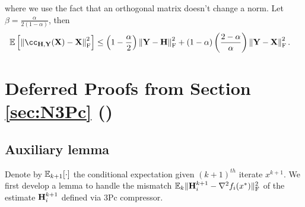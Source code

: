 \documentclass[11pt]{article}
\begin{document}
	where we use the fact that an orthogonal matrix doesn't change a norm. Let $\beta=\frac{\alpha}{2(1-\alpha)}$, then
	\begin{align}
		\ExpBr{\norm{\cc_{\mH,\mY}(\mX) - \mX}^2_{\rm F}} &\leq \left(1-\frac{\alpha}{2}\right)\norm{\mY-\mH}^2_{\rm F} + (1-\alpha)\left(\frac{2-\alpha}{\alpha}\right)\norm{\mY-\mX}^2_{\rm F}.
	\end{align}
	
	
	
	
	
	\section{Deferred Proofs from Section \ref{sec:N3Pc} ()}
	
	\subsection{Auxiliary lemma}
	
	Denote by $\mathbb{E}_{k+1}[\cdot]$ the conditional expectation given $(k+1)^{th}$ iterate $x^{k+1}$. We first develop a lemma to handle the mismatch $\mathbb{E}_k \|\mathbf{H}_i^{k+1} - \nabla^2 f_i(x^{*})\|^2_{\rm F}$ of the estimate $\mathbf{H}_i^{k+1}$ defined via 3Pc compressor.
	
\end{document}
